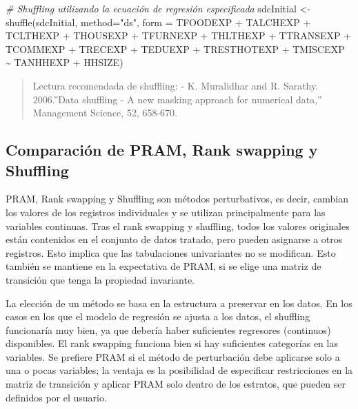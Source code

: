 \documentclass[
]{book}
\newenvironment{Shaded}{\begin{snugshade}}{\end{snugshade}}
\newcommand{\AttributeTok}[1]{\textcolor[rgb]{0.77,0.63,0.00}{#1}}
\newcommand{\CommentTok}[1]{\textcolor[rgb]{0.56,0.35,0.01}{\textit{#1}}}
\newcommand{\FunctionTok}[1]{\textcolor[rgb]{0.00,0.00,0.00}{#1}}
\newcommand{\NormalTok}[1]{#1}
\newcommand{\OtherTok}[1]{\textcolor[rgb]{0.56,0.35,0.01}{#1}}
\newcommand{\SpecialCharTok}[1]{\textcolor[rgb]{0.00,0.00,0.00}{#1}}
\newcommand{\StringTok}[1]{\textcolor[rgb]{0.31,0.60,0.02}{#1}}
\theoremstyle{definition}
\theoremstyle{definition}
\theoremstyle{definition}
\theoremstyle{definition}
\theoremstyle{remark}
\begin{document}
\begin{Shaded}
\begin{Highlighting}[]
\CommentTok{\# Shuffling utilizando la ecuación de regresión especificada}
\NormalTok{sdcInitial }\OtherTok{\textless{}{-}} \FunctionTok{shuffle}\NormalTok{(sdcInitial, }\AttributeTok{method=}\StringTok{"ds"}\NormalTok{, }
                      \AttributeTok{form =}\NormalTok{ TFOODEXP }\SpecialCharTok{+}\NormalTok{ TALCHEXP }\SpecialCharTok{+}\NormalTok{ TCLTHEXP }\SpecialCharTok{+}\NormalTok{ THOUSEXP }\SpecialCharTok{+} 
\NormalTok{                        TFURNEXP }\SpecialCharTok{+}\NormalTok{ THLTHEXP }\SpecialCharTok{+}\NormalTok{ TTRANSEXP }\SpecialCharTok{+}\NormalTok{ TCOMMEXP }\SpecialCharTok{+} 
\NormalTok{                        TRECEXP }\SpecialCharTok{+}\NormalTok{ TEDUEXP }\SpecialCharTok{+}\NormalTok{ TRESTHOTEXP }\SpecialCharTok{+}\NormalTok{ TMISCEXP }\SpecialCharTok{\textasciitilde{}}\NormalTok{ TANHHEXP }\SpecialCharTok{+}\NormalTok{ HHSIZE) }
\end{Highlighting}
\end{Shaded}

\begin{quote}
Lectura recomendada de shuffling:
- K. Muralidhar and R. Sarathy. 2006.''Data shuffling - A new masking approach for numerical data,'' Management Science, 52, 658-670.
\end{quote}

\hypertarget{comparaciuxf3n-de-pram-rank-swapping-y-shuffling}{%
\subsection{Comparación de PRAM, Rank swapping y Shuffling}\label{comparaciuxf3n-de-pram-rank-swapping-y-shuffling}}

PRAM, Rank swapping y Shuffling son métodos perturbativos, es decir, cambian los valores de los registros individuales y se utilizan principalmente para las variables continuas. Tras el rank swapping y shuffling, todos los valores originales están contenidos en el conjunto de datos tratado, pero pueden asignarse a otros registros. Esto implica que las tabulaciones univariantes no se modifican. Esto también se mantiene en la expectativa de PRAM, si se elige una matriz de transición que tenga la propiedad invariante.

La elección de un método se basa en la estructura a preservar en los datos. En los casos en los que el modelo de regresión se ajusta a los datos, el shuffling funcionaría muy bien, ya que debería haber suficientes regresores (continuos) disponibles. El rank swapping funciona bien si hay suficientes categorías en las variables. Se prefiere PRAM si el método de perturbación debe aplicarse solo a una o pocas variables; la ventaja es la posibilidad de especificar restricciones en la matriz de transición y aplicar PRAM solo dentro de los estratos, que pueden ser definidos por el usuario.
\end{document}
